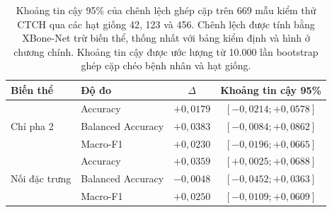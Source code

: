 \begin{table}[H]
\centering
\small
\begin{tabular}{llcc}
\toprule
\textbf{Biến thể} & \textbf{Độ đo} & \textbf{$\Delta$} & \textbf{Khoảng tin cậy 95\%} \\
\midrule
\multirow{3}{*}{Chỉ pha 2}
 & Accuracy & $+0{,}0179$ & $[-0{,}0214; +0{,}0578]$ \\
 & Balanced Accuracy & $+0{,}0383$ & $[-0{,}0084; +0{,}0862]$ \\
 & Macro-F1 & $+0{,}0230$ & $[-0{,}0196; +0{,}0665]$ \\
\midrule
\multirow{3}{*}{Nối đặc trưng}
 & Accuracy & $+0{,}0359$ & $[+0{,}0025; +0{,}0688]$ \\
 & Balanced Accuracy & $-0{,}0048$ & $[-0{,}0452; +0{,}0363]$ \\
 & Macro-F1 & $+0{,}0250$ & $[-0{,}0109; +0{,}0609]$ \\
\bottomrule
\end{tabular}
\caption{Khoảng tin cậy 95\% của chênh lệch ghép cặp trên 669 mẫu kiểm thử CTCH qua các hạt giống 42, 123 và 456. Chênh lệch được tính bằng XBone-Net trừ biến thể, thống nhất với bảng kiểm định và hình ở chương chính. Khoảng tin cậy được ước lượng từ 10.000 lần bootstrap ghép cặp chéo bệnh nhân và hạt giống.}
\label{tab:appendix-ablation-paired-confidence-intervals}
\end{table}
